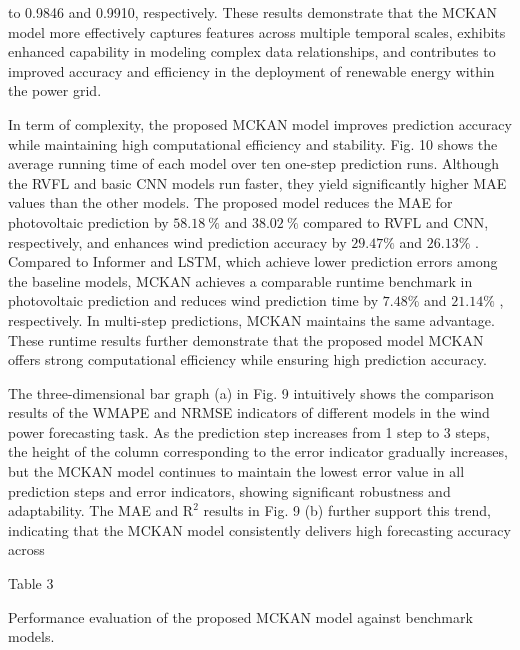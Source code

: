 \documentclass[
  10
]{article}
\begin{document}
to 0.9846 and 0.9910, respectively. These results demonstrate that the
MCKAN model more effectively captures features across multiple temporal
scales, exhibits enhanced capability in modeling complex data
relationships, and contributes to improved accuracy and efficiency in
the deployment of renewable energy within the power grid.

In term of complexity, the proposed MCKAN model improves prediction
accuracy while maintaining high computational efficiency and stability.
Fig. 10 shows the average running time of each model over ten one-step
prediction runs. Although the RVFL and basic CNN models run faster, they
yield significantly higher MAE values than the other models. The
proposed model reduces the MAE for photovoltaic prediction by
\(5 8 . 1 8 ~ \%\) and \(3 8 . 0 2 ~ \%\) compared to RVFL and CNN,
respectively, and enhances wind prediction accuracy by \(2 9 . 4 7 \%\)
and \(2 6 . 1 3 \%\) . Compared to Informer and LSTM, which achieve
lower prediction errors among the baseline models, MCKAN achieves a
comparable runtime benchmark in photovoltaic prediction and reduces wind
prediction time by \(7 . 4 8 \%\) and \(2 1 . 1 4 \%\) , respectively.
In multi-step predictions, MCKAN maintains the same advantage. These
runtime results further demonstrate that the proposed model MCKAN offers
strong computational efficiency while ensuring high prediction accuracy.

The three-dimensional bar graph (a) in Fig. 9 intuitively shows the
comparison results of the WMAPE and NRMSE indicators of different models
in the wind power forecasting task. As the prediction step increases
from 1 step to 3 steps, the height of the column corresponding to the
error indicator gradually increases, but the MCKAN model continues to
maintain the lowest error value in all prediction steps and error
indicators, showing significant robustness and adaptability. The MAE and
\(\mathrm { R } ^ { 2 }\) results in Fig. 9 (b) further support this
trend, indicating that the MCKAN model consistently delivers high
forecasting accuracy across

Table 3

Performance evaluation of the proposed MCKAN model against benchmark
models.
\end{document}
